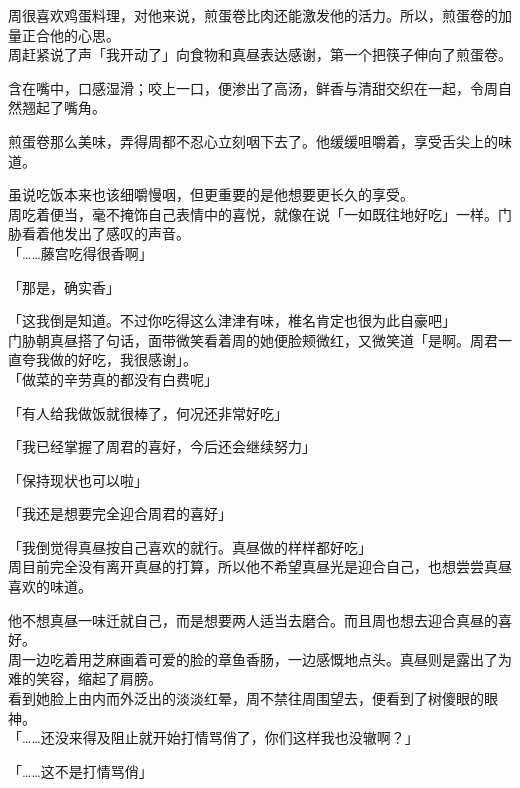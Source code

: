周很喜欢鸡蛋料理，对他来说，煎蛋卷比肉还能激发他的活力。所以，煎蛋卷的加量正合他的心思。\\

周赶紧说了声「我开动了」向食物和真昼表达感谢，第一个把筷子伸向了煎蛋卷。

含在嘴中，口感湿滑；咬上一口，便渗出了高汤，鲜香与清甜交织在一起，令周自然翘起了嘴角。

煎蛋卷那么美味，弄得周都不忍心立刻咽下去了。他缓缓咀嚼着，享受舌尖上的味道。

虽说吃饭本来也该细嚼慢咽，但更重要的是他想要更长久的享受。\\

周吃着便当，毫不掩饰自己表情中的喜悦，就像在说「一如既往地好吃」一样。门胁看着他发出了感叹的声音。\\

「……藤宫吃得很香啊」

「那是，确实香」

「这我倒是知道。不过你吃得这么津津有味，椎名肯定也很为此自豪吧」\\

门胁朝真昼搭了句话，面带微笑看着周的她便脸颊微红，又微笑道「是啊。周君一直夸我做的好吃，我很感谢」。\\

「做菜的辛劳真的都没有白费呢」

「有人给我做饭就很棒了，何况还非常好吃」

「我已经掌握了周君的喜好，今后还会继续努力」

「保持现状也可以啦」

「我还是想要完全迎合周君的喜好」

「我倒觉得真昼按自己喜欢的就行。真昼做的样样都好吃」\\

周目前完全没有离开真昼的打算，所以他不希望真昼光是迎合自己，也想尝尝真昼喜欢的味道。

他不想真昼一味迁就自己，而是想要两人适当去磨合。而且周也想去迎合真昼的喜好。\\

周一边吃着用芝麻画着可爱的脸的章鱼香肠，一边感慨地点头。真昼则是露出了为难的笑容，缩起了肩膀。\\

看到她脸上由内而外泛出的淡淡红晕，周不禁往周围望去，便看到了树傻眼的眼神。\\

「……还没来得及阻止就开始打情骂俏了，你们这样我也没辙啊？」

「……这不是打情骂俏」

